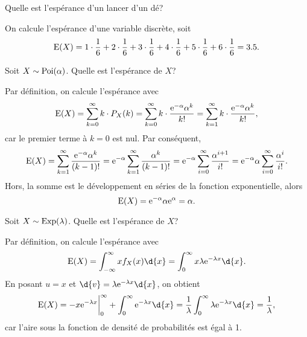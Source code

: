 \documentclass[11pt]{article}
\newcommand\e{%
	\ensuremath{%
		\mathrm{e}%
	}%
}%
\newcommand\poi{%
	\ensuremath{%
		\mathrm{Poi}%
	}%
}%
\newcommand\Exp{%
	\ensuremath{%
		\mathrm{Exp}%
	}%
}%
\newcommand\Esp{%
	\ensuremath{%
		\mathrm{E}%
	}%
}%
\begin{document}
\begin{exemple}
	Quelle est l'espérance d'un lancer d'un dé?

	On calcule l'espérance d'une variable discrète, soit
	\begin{equation*}
		\Esp(X)=
			1\cdot\frac{1}{6}+
			2\cdot\frac{1}{6}+
			3\cdot\frac{1}{6}+
			4\cdot\frac{1}{6}+
			5\cdot\frac{1}{6}+
			6\cdot\frac{1}{6}
		=3.5.
	\end{equation*}
\end{exemple}

\begin{exemple}
	Soit $X\sim\poi(\alpha)$. Quelle est l'espérance de $X$?

	Par définition, on calcule l'espérance avec
	\begin{equation*}
		\Esp(X)
		=\sum_{k=0}^\infty k\cdot P_X(k)
		=\sum_{k=0}^\infty k\cdot\frac{\e^{-\alpha}\alpha^k}{k!}
		=\sum_{k=1}^\infty k\cdot\frac{\e^{-\alpha}\alpha^k}{k!},
	\end{equation*}
	car le premier terme à $k=0$ est nul. Par conséquent,
	\begin{equation*}
		\Esp(X)
		=\sum_{k=1}^\infty\frac{\e^{-\alpha}\alpha^k}{(k-1)!}
		=\e^{-\alpha}\sum_{k=1}^\infty\frac{\alpha^k}{(k-1)!}
		=\e^{-\alpha}\sum_{i=0}^\infty\frac{\alpha^{i+1}}{i!}
		=\e^{-\alpha}\alpha\sum_{i=0}^\infty\frac{\alpha^i}{i!}.
	\end{equation*}
	Hors, la somme est le développement en séries de la fonction exponentielle,
	alors
	\begin{equation*}
		\Esp(X)
		=\e^{-\alpha}\alpha\e^{\alpha}
		=\alpha.
	\end{equation*}
\end{exemple}

\pagebreak
\begin{exemple}
	Soit $X\sim\Exp(\lambda)$. Quelle est l'espérance de $X$?

	Par définition, on calcule l'espérance avec
	\begin{equation*}
		\Esp(X)
		=\int_{-\infty}^\infty xf_X(x)\d{x}
		=\int_0^\infty x\lambda\e^{-\lambda x}\d{x}.
	\end{equation*}
	En posant $u=x$ et $\d{v}=\lambda\e^{-\lambda x}\d{x}$, on obtient
	\begin{equation*}
		\Esp(X)
		=-x\e^{-\lambda x}\bigg\rvert_0^\infty
		+\int_0^\infty\e^{-\lambda x}\d{x}
		=\frac{1}{\lambda}\int_0^\infty\lambda\e^{-\lambda x}\d{x}
		=\frac{1}{\lambda},
	\end{equation*}
	car l'aire sous la fonction de densité de probabilités est égal à 1.
\end{exemple}
\end{document}
